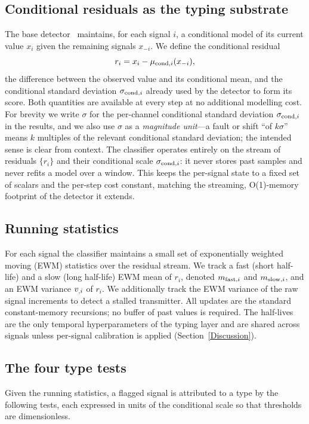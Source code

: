 \subsection{Conditional residuals as the typing substrate}
The base detector~\citep{Wadinger2023} maintains, for each signal $i$, a conditional model of its current value $x_i$ given the remaining signals $x_{-i}$. We define the conditional residual
\begin{equation}
    r_i = x_i - \mu _{\text{cond}, i}(x_{-i}),
\end{equation}
the difference between the observed value and its conditional mean, and the conditional standard deviation $\sigma _{\text{cond}, i}$ already used by the detector to form its score. Both quantities are available at every step at no additional modelling cost. For brevity we write $\sigma$ for the per-channel conditional standard deviation $\sigma _{\text{cond}, i}$ in the results, and we also use $\sigma$ as a \emph{magnitude unit}---a fault or shift ``of $k\sigma$'' means $k$ multiples of the relevant conditional standard deviation; the intended sense is clear from context. The classifier operates entirely on the stream of residuals $\{r_i\}$ and their conditional scale $\sigma _{\text{cond}, i}$: it never stores past samples and never refits a model over a window. This keeps the per-signal state to a fixed set of scalars and the per-step cost constant, matching the streaming, O(1)-memory footprint of the detector it extends.

\subsection{Running statistics}
For each signal the classifier maintains a small set of exponentially weighted moving (EWM) statistics over the residual stream. We track a fast (short half-life) and a slow (long half-life) EWM mean of $r_i$, denoted $m _{\text{fast}, i}$ and $m _{\text{slow}, i}$, and an EWM variance $v _{\text{}, i}$ of $r_i$. We additionally track the EWM variance of the raw signal increments to detect a stalled transmitter. All updates are the standard constant-memory recursions; no buffer of past values is required. The half-lives are the only temporal hyperparameters of the typing layer and are shared across signals unless per-signal calibration is applied (Section~\ref{Discussion}).

\subsection{The four type tests}
Given the running statistics, a flagged signal is attributed to a type by the following tests, each expressed in units of the conditional scale so that thresholds are dimensionless.

